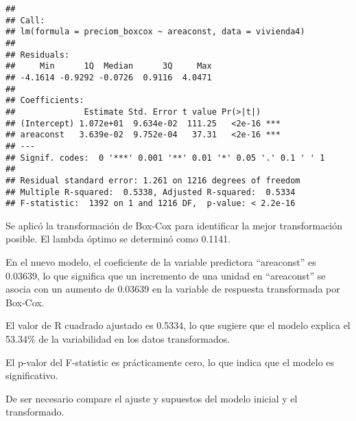 \documentclass[
]{article}
\begin{document}
\begin{verbatim}
## 
## Call:
## lm(formula = preciom_boxcox ~ areaconst, data = vivienda4)
## 
## Residuals:
##     Min      1Q  Median      3Q     Max 
## -4.1614 -0.9292 -0.0726  0.9116  4.0471 
## 
## Coefficients:
##              Estimate Std. Error t value Pr(>|t|)    
## (Intercept) 1.072e+01  9.634e-02  111.25   <2e-16 ***
## areaconst   3.639e-02  9.752e-04   37.31   <2e-16 ***
## ---
## Signif. codes:  0 '***' 0.001 '**' 0.01 '*' 0.05 '.' 0.1 ' ' 1
## 
## Residual standard error: 1.261 on 1216 degrees of freedom
## Multiple R-squared:  0.5338, Adjusted R-squared:  0.5334 
## F-statistic:  1392 on 1 and 1216 DF,  p-value: < 2.2e-16
\end{verbatim}

Se aplicó la transformación de Box-Cox para identificar la mejor
transformación posible. El lambda óptimo se determinó como 0.1141.

En el nuevo modelo, el coeficiente de la variable predictora
``areaconst'' es 0.03639, lo que significa que un incremento de una
unidad en ``areaconst'' se asocia con un aumento de 0.03639 en la
variable de respuesta transformada por Box-Cox.

El valor de R cuadrado ajustado es 0.5334, lo que sugiere que el modelo
explica el 53.34\% de la variabilidad en los datos transformados.

El p-valor del F-statistic es prácticamente cero, lo que indica que el
modelo es significativo.

De ser necesario compare el ajuste y supuestos del modelo inicial y el
transformado.
\end{document}
